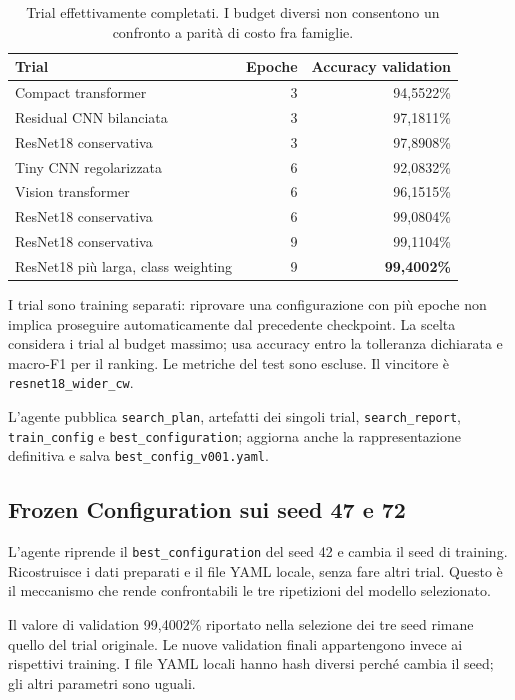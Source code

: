 \documentclass[11pt,a4paper]{article}
\newcommand{\artefatto}[1]{\nolinkurl{#1}}
\newcommand{\file}[1]{\nolinkurl{#1}}
\begin{document}
\begin{table}[htbp]
\centering\small
\begin{tabularx}{\textwidth}{@{}Xrr@{}}
\toprule
\textbf{Trial} & \textbf{Epoche} & \textbf{Accuracy validation}\\
\midrule
Compact transformer & 3 & 94,5522\%\\
Residual CNN bilanciata & 3 & 97,1811\%\\
ResNet18 conservativa & 3 & 97,8908\%\\
Tiny CNN regolarizzata & 6 & 92,0832\%\\
Vision transformer & 6 & 96,1515\%\\
ResNet18 conservativa & 6 & 99,0804\%\\
ResNet18 conservativa & 9 & 99,1104\%\\
ResNet18 più larga, class weighting & 9 & \textbf{99,4002\%}\\
\bottomrule
\end{tabularx}
\caption{Trial effettivamente completati. I budget diversi non consentono
un confronto a parità di costo fra famiglie.}
\end{table}

I trial sono training separati: riprovare una configurazione con più epoche
non implica proseguire automaticamente dal precedente checkpoint.
La scelta considera i trial al budget massimo; usa accuracy entro la
tolleranza dichiarata e macro-F1 per il ranking. Le metriche del test
sono escluse. Il vincitore è \artefatto{resnet18_wider_cw}.

L'agente pubblica \artefatto{search_plan}, artefatti dei singoli trial,
\artefatto{search_report}, \artefatto{train_config} e
\artefatto{best_configuration}; aggiorna anche la rappresentazione definitiva
e salva \file{best_config_v001.yaml}.

\subsection{Frozen Configuration sui seed 47 e 72}
L'agente riprende il \artefatto{best_configuration} del seed 42 e cambia
il seed di training. Ricostruisce i dati preparati e il file YAML locale,
senza fare altri trial. Questo è il meccanismo che rende confrontabili
le tre ripetizioni del modello selezionato.

Il valore di validation 99,4002\% riportato nella selezione dei tre seed
rimane quello del trial originale. Le nuove validation finali appartengono
invece ai rispettivi training. I file YAML locali hanno hash diversi
perché cambia il seed; gli altri parametri sono uguali.
\end{document}
